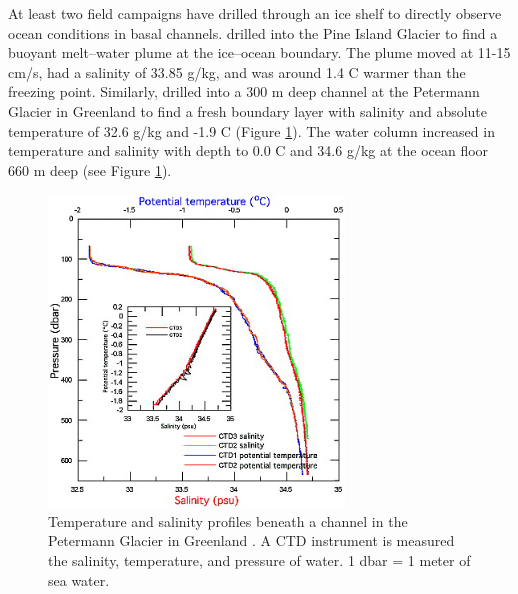 At least two field campaigns have drilled through an ice shelf to directly observe ocean conditions in basal channels.
\cite{stanton2013channelized} drilled into the Pine Island Glacier to find a buoyant melt--water plume at the ice--ocean boundary. The plume moved at 11-15 cm/s, had a salinity of 33.85 g/kg, and was around 1.4 \textdegree C warmer than the freezing point. Similarly, \cite{rignot2008channelized} drilled into a 300 m deep channel at the Petermann Glacier in Greenland to find a fresh boundary layer with salinity and absolute temperature of  32.6 g/kg and -1.9 \textdegree C (Figure \ref{fig:oceanobs3}). The water column increased in temperature and salinity with depth to 0.0 \textdegree C and 34.6 g/kg at the ocean floor 660 m deep (see Figure \ref{fig:oceanobs3}).

\begin{figure}[!ht]
\centering
\includegraphics[width=0.7\textwidth]{chapters/4/oceanobs3.png}
\caption[Petermann observations]{Temperature and salinity profiles beneath a channel in the Petermann Glacier in Greenland \cite{rignot2008channelized}. A CTD instrument is measured the salinity, temperature, and pressure of water. 1 dbar = 1 meter of sea water.}
\label{fig:oceanobs3}
\end{figure}

